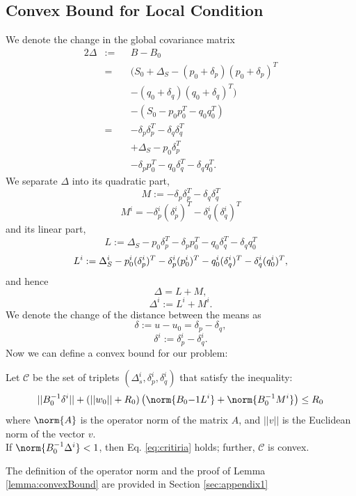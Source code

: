 \subsection{Convex Bound for Local Condition}
We denote the change in the global covariance matrix
\begin{alignat*}{2}
\Delta & := && B-B_0 \\
& = && (S_0+\Delta_S - (p_0+\delta_p)(p_0+\delta_p)^T \\
& && - (q_0+\delta_q)(q_0+\delta_q)^T) \\
& && - (S_0 - p_0p_0^T - q_0q_0^T) \\
& = && - \delta_p\delta_p^T - \delta_q\delta_q^T \\
& && + \Delta_S - p_0\delta_p^T \\
& && - \delta_pp_0^T - q_0\delta_q^T - \delta_qq_0^T.
\end{alignat*}
We separate $\Delta$ into its quadratic part,
\begin{equation*}
M:= - \delta_p\delta_p^T - \delta_q\delta_q^T
\end{equation*}
\begin{equation*}
M^i = - \delta_p^i(\delta_p^i)^T - \delta_q^i(\delta_q^i)^T
\end{equation*}
and its linear part,
\begin{equation*}
L:= \Delta_S - p_0\delta_p^T - \delta_pp_0^T - q_0\delta_q^T - \delta_qq_0^T
\end{equation*}
\begin{equation*}
\\ L^i := \Delta_S^i - p_0^i(\delta_p^i)^T - \delta_p^i(p_0^i)^T -
q_0^i(\delta_q^i)^T - \delta_q^i(q_0^i)^T,
\end{equation*}
and hence
\begin{equation*}
\Delta= L+ M, 
\end{equation*}
\begin{equation*}
\Delta^i:= L^i+ M^i.
\end{equation*}
We denote the change of the distance between the means as
\begin{equation*}
\delta:= u-u_0 = \delta_p - \delta_q, 
\end{equation*}
\begin{equation*}
\delta^i:=\delta_p^i - \delta_q^i.
\end{equation*}
Now we can define a convex bound for our problem:
\begin{lemma} \label{lemma:convexBound}
Let $\mathcal{C}$ be the set of triplets $(\Delta_s^i, \delta_p^i, \delta_q^i)$
 that satisfy the inequality:
 \begin{equation} \label{eq:convexBound}
||B_0^{-1}\delta^i|| + \left(||w_0||+R_0\right)\left(\norm{B_0{-1}L^i} + 
\norm{B_0^{-1}M^i}\right) \leq  R_0
\end{equation}
where $\norm{A}$ is the operator norm of the matrix $A$, and $||v||$ is the 
Euclidean norm of the vector $v$.
\\If $\norm{B_0^{-1}\Delta^i} < 1$, then 
Eq. \ref{eq:critiria} holds; further, $\mathcal{C}$ is convex.
\end{lemma}
The definition of the operator norm and the proof of Lemma \ref{lemma:convexBound} 
are provided in Section \ref{sec:appendix1}

